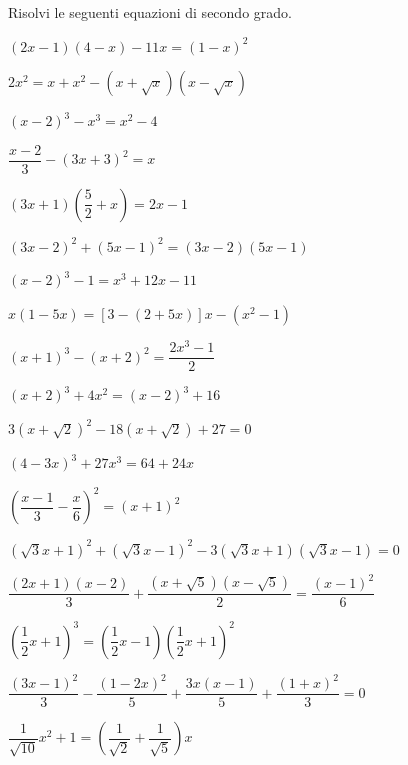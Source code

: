 \begin{esercizio}[*]
\label{ese:3.30}
Risolvi le seguenti equazioni di secondo grado.
\begin{enumeratea}
\item \((2 x-1) (4-x)-11 x = (1-x)^{2}\)
\sol{\emptyset}
\item \(2x^{2} = x + x^{2}-(x + \sqrt{x}) (x-\sqrt{x})\)
\item \((x-2)^{3}-x^{3} = x^{2}-4\)
\item \(\dfrac{x-2}{3}-(3 x + 3)^{2} = x\)
\item \((3 x + 1) \left(\dfrac{5}{2} + x \right) = 2 x-1\)
\item \((3 x-2)^{2} + (5 x-1)^{2} = (3 x-2) (5 x-1)\)
\sol{\emptyset}
\item \((x-2)^{3}-1 = x^{3} + 12 x-11\)
\item \(x (1-5 x) = [ 3-(2 + 5 x) ] x-(x^{2}-1)\)
\item \((x + 1)^{3}-(x + 2)^{2} = \dfrac{2 x^{3}-1}{2}\)
\item \((x + 2)^{3} + 4 x^{2} = (x-2)^{3} + 16\)
\item \(3 \left(x +\sqrt{2} \right)^{2}-18 \left(x +\sqrt{2}\right) +27 =
0\)
\item \((4-3 x)^{3} + 27 x^{3} = 64 + 24 x\)
\item \(\left(\dfrac{x-1}{3}-\dfrac{x}{6} \right)^{2} = (x + 1)^{2}\)
\item \((\sqrt{3} x + 1)^{2} + (\sqrt{3} x-1)^{2}-3 (\sqrt{3}x + 1) 
(\sqrt{3} x-1) = 0\)
\item \(\dfrac{(2 x + 1) (x-2)}{3} + \dfrac{(x + \sqrt{5}) (x -\sqrt{5})}
{2} = \dfrac{(x-1)^{2}}{6}\)
\item \(\left(\dfrac{1}{2} x +1 \right)^{3} = \left(\dfrac{1}{2} x-1\right) 
\left(\dfrac{1}{2} x + 1 \right)^{2}\)
\item \(\dfrac{(3 x-1)^{2}}{3}-\dfrac{(1-2 x)^{2}}{5} + \dfrac{3 x (x-1)}
{5} + \dfrac{(1 + x)^{2}}{3} = 0\)
\sol{\emptyset}
\item \(\dfrac{1}{\sqrt{10}} x^{2} + 1 = \left(\dfrac{1}{\sqrt{2}} 
+\dfrac{1}{\sqrt{5}} \right) x\)

\end{enumeratea}
\end{esercizio}
